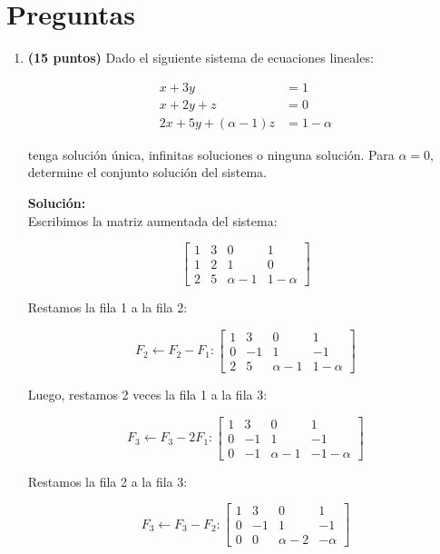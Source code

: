 \documentclass[a4paper]{article}
\begin{document}
\section*{Preguntas}
\begin{enumerate}



\item {\bf (15 puntos)} Dado el siguiente sistema de ecuaciones lineales:

    \begin{align*}
 x + 3y &= 1 \\
 x + 2y +z &= 0\\
2 x + 5y +(\alpha -1) z &= 1-\alpha 
\end{align*}

    tenga solución única, infinitas soluciones o ninguna solución. Para $\alpha=0$, determine el conjunto soluci\'on del sistema.



 \textbf{Soluci\'on:}\\
Escribimos la matriz aumentada del sistema:

\[
\left[
\begin{array}{ccc|c}
1 & 3 & 0 & 1 \\
1 & 2 & 1 & 0 \\
2 & 5 & \alpha - 1 & 1 - \alpha
\end{array}
\right]
\]

Restamos la fila 1 a la fila 2:

\[
F_2 \leftarrow F_2 - F_1:
\left[
\begin{array}{ccc|c}
1 & 3 & 0 & 1 \\
0 & -1 & 1 & -1 \\
2 & 5 & \alpha - 1 & 1 - \alpha
\end{array}
\right]
\]

Luego, restamos 2 veces la fila 1 a la fila 3:

\[
F_3 \leftarrow F_3 - 2F_1:
\left[
\begin{array}{ccc|c}
1 & 3 & 0 & 1 \\
0 & -1 & 1 & -1 \\
0 & -1 & \alpha - 1 & -1 - \alpha
\end{array}
\right]
\]

Restamos la fila 2 a la fila 3:

\[
F_3 \leftarrow F_3 - F_2:
\left[
\begin{array}{ccc|c}
1 & 3 & 0 & 1 \\
0 & -1 & 1 & -1 \\
0 & 0 & \alpha - 2 & -\alpha
\end{array}
\right]
\]



\end{enumerate}
\end{document}
